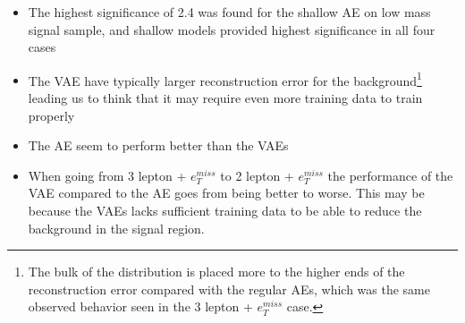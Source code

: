 \begin{itemize}
    \item The highest significance of 2.4 was found for the shallow AE on low mass signal sample, and shallow models provided highest significance in all four cases
    \item The VAE have typically larger reconstruction error for the background\footnote{The bulk of the distribution is placed more to the higher ends of the reconstruction error compared with the regular AEs, which was the same observed behavior seen in the 3 lepton + $e_T^{miss}$ case.} leading us to think that it may require even more training data to train properly 
    \item The AE seem to perform better than the VAEs
    \item When going from 3 lepton + $e_T^{miss}$ to 2 lepton + $e_T^{miss}$ the performance of the VAE compared to the AE goes from being better to worse. This may be because the VAEs lacks sufficient training data to be able to reduce the background in the signal region. 
\end{itemize}






